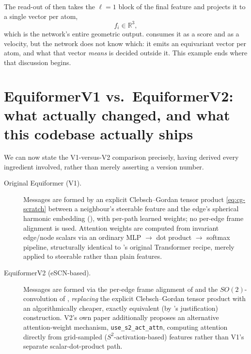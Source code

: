 \documentclass[11pt,a4paper]{report}
\theoremstyle{definition}
\theoremstyle{remark}
\newcommand{\RR}{\mathbb R}
\begin{document}
The read-out of  then takes the $\ell=1$ block
of the final feature and projects it to a single vector per atom,
\[
f_i\in\RR^3 ,
\]
which is the network's entire geometric output. 
consumes it as a score and  as a velocity, but the
network does not know which: it emits an equivariant vector per atom, and
what that vector \emph{means} is decided outside it. This example ends
where that discussion begins.


\section{EquiformerV1 vs.\ EquiformerV2: what actually changed, and what this codebase actually ships}
\label{sec:v1-vs-v2-scratch}

We can now state the V1-versus-V2 comparison precisely, having derived
every ingredient involved, rather than merely asserting a version number.

\begin{description}
\item[Original Equiformer (V1).] Messages are formed by an explicit
Clebsch--Gordan tensor product \eqref{eq:cg-scratch} between a neighbour's
steerable feature and the edge's spherical harmonic embedding
(), with per-path learned weights; no
per-edge frame alignment is used. Attention weights are computed from
invariant edge/node scalars via an ordinary MLP $\to$ dot product $\to$
softmax pipeline, structurally identical to
's original Transformer recipe, merely applied
to steerable rather than plain features.
\item[EquiformerV2 (eSCN-based).] Messages are formed via the per-edge
frame alignment of  and the $SO(2)$-convolution
of , \emph{replacing} the explicit Clebsch--Gordan
tensor product with an algorithmically cheaper, exactly equivalent (by
's justification) construction. V2's own paper
additionally proposes an alternative attention-weight mechanism,
\texttt{use\_s2\_act\_attn}, computing attention directly from grid-sampled
($S^2$-activation-based) features rather than V1's separate scalar-dot-product
path.
\end{description}
\end{document}
